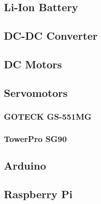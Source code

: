 \subsection{Li-Ion Battery}



\subsection{DC-DC Converter}



\subsection{DC Motors}



\subsection{Servomotors}
	\subsubsection{GOTECK GS-551MG}



	\subsubsection{TowerPro SG90}



\subsection{Arduino}



\subsection{Raspberry Pi}



